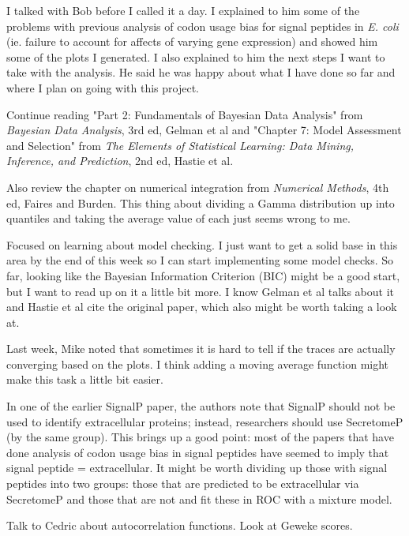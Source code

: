 \documentclass[11pt]{labbook}
\begin{document}
I talked with Bob before I called it a day. I explained to him some of the problems with previous analysis of codon usage bias for signal peptides in \textit{E. coli} (ie. failure to account for affects of varying gene expression) and showed him some of the plots I generated. I also explained to him the next steps I want to take with the analysis. He said he was happy about what I have done so far and where I plan on going with this project.

Continue reading "Part 2: Fundamentals of Bayesian Data Analysis" from \textit{Bayesian Data Analysis}, 3rd ed, Gelman et al and "Chapter 7: Model Assessment and Selection" from \textit{The Elements of Statistical Learning: Data Mining, Inference, and Prediction}, 2nd ed, Hastie et al.

Also review the chapter on numerical integration from \textit{Numerical Methods}, 4th ed, Faires and Burden. This thing about dividing a Gamma distribution up into quantiles and taking the average value of each just seems wrong to me. 

Focused on learning about model checking. I just want to get a solid base in this area by the end of this week so I can start implementing some model checks. So far, looking like the Bayesian Information Criterion (BIC) might be a good start, but I want to read up on it a little bit more. I know Gelman et al talks about it and Hastie et al cite the original paper, which also might be worth taking a look at. 

Last week, Mike noted that sometimes it is hard to tell if the traces are actually converging based on the plots. I think adding a moving average function might make this task a little bit easier. 

In one of the earlier SignalP paper, the authors note that SignalP should not be used to identify extracellular proteins; instead, researchers should use SecretomeP (by the same group). This brings up a good point: most of the papers that have done analysis of codon usage bias in signal peptides have seemed to imply that signal peptide = extracellular. It might be worth dividing up those with signal peptides into two groups: those that are predicted to be extracellular via SecretomeP and those that are not and fit these in ROC with a mixture model. 

Talk to Cedric about autocorrelation functions. Look at Geweke scores. 
\end{document}

